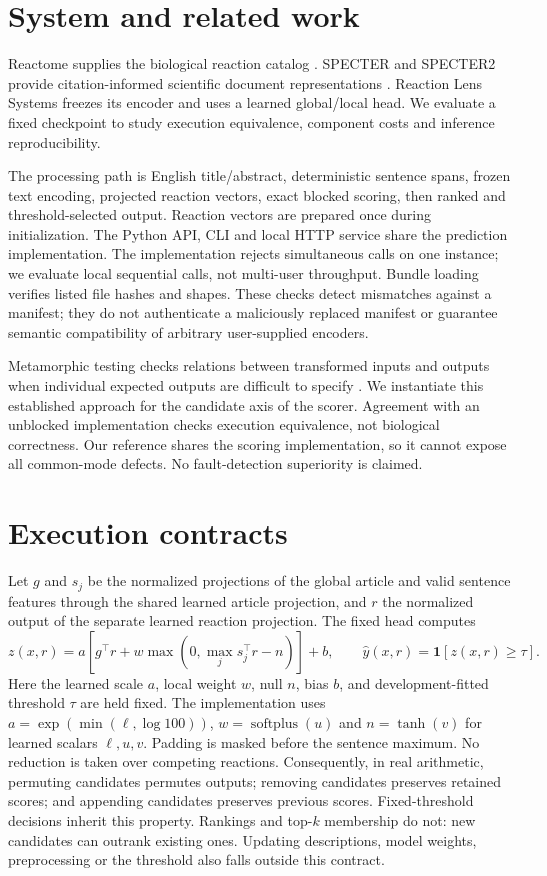 \documentclass[11pt,a4paper]{article}
\begin{document}
\section{System and related work}
Reactome supplies the biological reaction catalog \citep{reactome2026}.
SPECTER and SPECTER2 provide citation-informed scientific document representations
\citep{cohan2020specter,singh2023scirepeval}. Reaction Lens Systems freezes its encoder and
uses a learned global/local head. We evaluate a fixed checkpoint to study
execution equivalence, component costs and inference reproducibility.

The processing path is English title/abstract, deterministic sentence spans,
frozen text encoding, projected reaction vectors, exact blocked scoring, then
ranked and threshold-selected output. Reaction vectors are prepared once during
initialization. The Python API, CLI and local HTTP service share the prediction
implementation. The implementation rejects simultaneous calls on one instance;
we evaluate local sequential calls, not multi-user throughput. Bundle loading
verifies listed file hashes and shapes. These checks detect mismatches against a
manifest; they do not authenticate a maliciously replaced manifest or guarantee
semantic compatibility of arbitrary user-supplied encoders.

Metamorphic testing checks relations between transformed inputs and outputs when
individual expected outputs are difficult to specify \citep{segura2016}.
We instantiate this established approach for the candidate axis of the scorer.
Agreement with an unblocked implementation checks execution equivalence, not
biological correctness. Our reference shares the scoring implementation, so it
cannot expose all common-mode defects. No fault-detection superiority is claimed.

\section{Execution contracts}
Let $g$ and $s_j$ be the normalized projections of the global article and
valid sentence features through the shared learned article projection, and $r$
the normalized output of the separate learned reaction projection. The fixed head computes
\begin{equation}
 z(x,r)=a\left[g^\top r+w\max\left(0,\max_j s_j^\top r-n\right)\right]+b,
 \qquad \widehat{y}(x,r)=\mathbf{1}[z(x,r)\geq\tau].
\end{equation}
Here the learned scale $a$, local weight $w$, null $n$, bias $b$, and development-fitted
threshold $\tau$ are held fixed. The implementation uses
$a=\exp(\min(\ell,\log 100))$, $w=\operatorname{softplus}(u)$ and
$n=\tanh(v)$ for learned scalars $\ell,u,v$. Padding is masked before the
sentence maximum. No reduction is taken over competing reactions.
Consequently, in real arithmetic, permuting candidates permutes outputs; removing
candidates preserves retained scores; and appending candidates preserves previous
scores. Fixed-threshold decisions inherit this property. Rankings and top-$k$
membership do not: new candidates can outrank existing ones. Updating descriptions,
model weights, preprocessing or the threshold also falls outside this contract.
\end{document}
